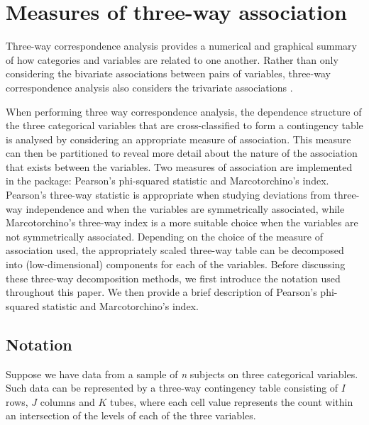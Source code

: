  


\section{Measures of three-way association}
\label{s.2}


Three-way correspondence analysis provides a numerical and graphical summary of how categories and variables are related to one another. Rather than only considering the bivariate associations between pairs of variables, three-way correspondence analysis also considers the trivariate associations \citep{lombehkro21}.  

When performing three way correspondence analysis, the dependence structure of the three categorical variables that are cross-classified to form a contingency table is analysed by considering an appropriate measure of association. This measure can then be partitioned to reveal more detail about the nature of the association that exists between the variables. Two measures of association are implemented in the  package: Pearson's phi-squared statistic and Marcotorchino's index. Pearson's three-way statistic is appropriate when studying deviations from three-way independence and when the variables are symmetrically associated, while Marcotorchino's three-way index is a more suitable choice when the variables are not symmetrically associated. 
Depending on the choice of the measure of association used, the appropriately scaled three-way table can be decomposed into (low-dimensional) components for each of the variables. Before discussing these three-way decomposition methods, we first introduce the notation used throughout this paper. We then provide a brief description of Pearson's phi-squared statistic and Marcotorchino's index. 
\subsection{Notation}
\label{s.notation}

Suppose we have data from a sample of {\it n} subjects on three categorical variables. Such data can be represented by a three-way contingency table consisting of $I$ rows, $J$ columns and $K$ tubes, where each cell value represents the count within an intersection of the levels of each of the three variables. 

